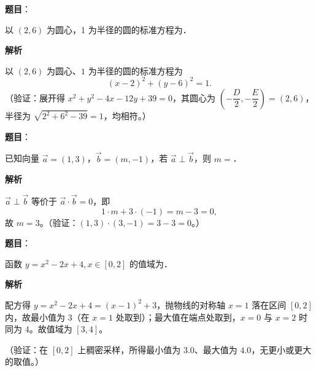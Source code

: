 \begin{answer}

\textbf{题目}：

以 \((2,6)\) 为圆心，1 为半径的圆的标准方程为\gkblank{}．

\textbf{解析}

以 \((2,6)\) 为圆心、\(1\) 为半径的圆的标准方程为
\nopagebreak[4]
\[
(x-2)^{2}+(y-6)^{2}=1.
\]
（验证：展开得 \(x^{2}+y^{2}-4x-12y+39=0\)，其圆心为 \(\left(-\dfrac{D}{2},-\dfrac{E}{2}\right)=(2,6)\)，半径为 \(\sqrt{2^{2}+6^{2}-39}=1\)，均相符。）


\end{answer}
\begin{answer}

\textbf{题目}：

已知向量 \(\vec{a}=(1,3)\)，\(\vec{b}=(m,-1)\)，若 \(\vec{a}\perp\vec{b}\)，则 \(m=\)\gkblank{}．

\textbf{解析}

\(\vec{a}\perp\vec{b}\) 等价于 \(\vec{a}\cdot\vec{b}=0\)，即
\nopagebreak[4]
\[
1\cdot m+3\cdot(-1)=m-3=0,
\]
故 \(m=3\)。（验证：\((1,3)\cdot(3,-1)=3-3=0\)。）


\end{answer}
\begin{answer}

\textbf{题目}：

函数 \(y=x^{2}-2x+4,x\in[0,2]\) 的值域为\gkblank{}．

\textbf{解析}

配方得 \(y=x^{2}-2x+4=(x-1)^{2}+3\)，抛物线的对称轴 \(x=1\) 落在区间 \([0,2]\) 内，故最小值为 \(3\)（在 \(x=1\) 处取到）；最大值在端点处取到，\(x=0\) 与 \(x=2\) 时同为 \(4\)。故值域为 \([3,4]\)。

（验证：在 \([0,2]\) 上稠密采样，所得最小值为 \(3.0\)、最大值为 \(4.0\)，无更小或更大的取值。）


\end{answer}
